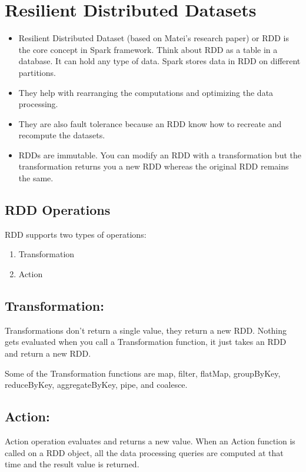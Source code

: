 \documentclass[a4paper,12pt]{article}
\begin{document}
\section*{Resilient Distributed Datasets}
\begin{itemize}
 \item  Resilient Distributed Dataset (based on Matei’s research paper) or RDD is the core concept in Spark framework. Think about RDD as a table in a database. It can hold any type of data. Spark stores data in RDD on different partitions.

 \item  They help with rearranging the computations and optimizing the data processing.

 \item  They are also fault tolerance because an RDD know how to recreate and recompute the datasets.

 \item  RDDs are immutable. You can modify an RDD with a transformation but the transformation returns you a new RDD whereas the original RDD remains the same.
\end{itemize}

\subsection*{RDD Operations}
RDD supports two types of operations:

\begin{enumerate}
 \item  Transformation
 \item  Action

\end{enumerate}

\subsection*{Transformation: }
Transformations don't return a single value, they return a new RDD. Nothing gets evaluated when you call a Transformation function, it just takes an RDD and return a new RDD.

Some of the Transformation functions are map, filter, flatMap, groupByKey, reduceByKey, aggregateByKey, pipe, and coalesce.

\subsection*{Action: }
Action operation evaluates and returns a new value. When an Action function is called on a RDD object, all the data processing queries are computed at that time and the result value is returned.
\end{document}
